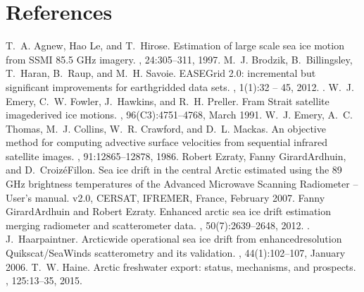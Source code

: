 \documentclass[letterpaper,10pt,english]{jupyterBook}
\begin{document}
\chapter{References}
\label{\detokenize{references:references}}\label{\detokenize{references::doc}}
\begin{sphinxthebibliography}{10}
\sphinxAtStartPar
T. A. Agnew, Hao Le, and T. Hirose. Estimation of large scale sea ice motion from SSMI 85.5 GHz imagery. , 24:305–311, 1997.
\sphinxAtStartPar
M. J. Brodzik, B. Billingsley, T. Haran, B. Raup, and M. H. Savoie. EASE\sphinxhyphen{}Grid 2.0: incremental but significant improvements for earth\sphinxhyphen{}gridded data sets. , 1(1):32 – 45, 2012. .
\sphinxAtStartPar
W. J. Emery, C. W. Fowler, J. Hawkins, and R. H. Preller. Fram Strait satellite image\sphinxhyphen{}derived ice motions. , 96(C3):4751–4768, March 1991.
\sphinxAtStartPar
W. J. Emery, A. C. Thomas, M. J. Collins, W. R. Crawford, and D. L. Mackas. An objective method for computing advective surface velocities from sequential infrared satellite images. , 91:12865–12878, 1986.
\sphinxAtStartPar
Robert Ezraty, Fanny Girard\sphinxhyphen{}Ardhuin, and D. Croizé\sphinxhyphen{}Fillon. Sea ice drift in the central Arctic estimated using the 89 GHz brightness temperatures of the Advanced Microwave Scanning Radiometer – User's manual. v2.0, CERSAT, IFREMER, France, February 2007.
\sphinxAtStartPar
Fanny Girard\sphinxhyphen{}Ardhuin and Robert Ezraty. Enhanced arctic sea ice drift estimation merging radiometer and scatterometer data. , 50(7):2639–2648, 2012. .
\sphinxAtStartPar
J. Haarpaintner. Arctic\sphinxhyphen{}wide operational sea ice drift from enhanced\sphinxhyphen{}resolution Quikscat/SeaWinds scatterometry and its validation. , 44(1):102–107, January 2006.
\sphinxAtStartPar
T. W. Haine. Arctic freshwater export: status, mechanisms, and prospects. , 125:13–35, 2015.

\end{sphinxthebibliography}
\end{document}
